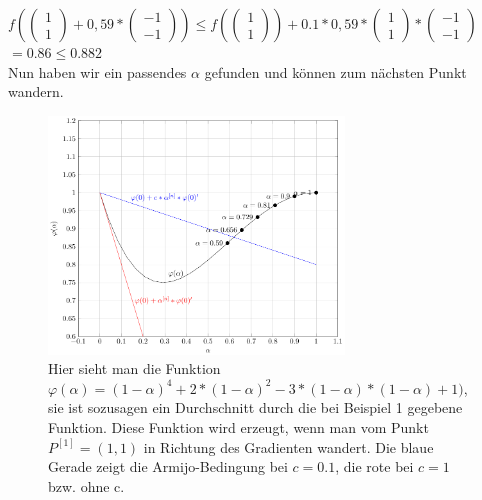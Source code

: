 \documentclass[naustrian]{article}
\begin{document}
{\begin{enumerate}
    $f( \left( \begin{array}{c} 1 \\ 1 \end{array} \right) + 0,59 * \left( \begin{array}{c} -1 \\ -1 \end{array} \right)) \leq f(\left( \begin{array}{c} 1 \\ 1 \end{array} \right)) + 0.1 * 0,59 *  \left( \begin{array}{c} 1 \\ 1 \end{array} \right) * \left( \begin{array}{c} -1 \\ -1 \end{array} \right)$ \\
    $= 0.86 \leq 0.882$ \\
    Nun haben wir ein passendes $\alpha$ gefunden und können zum nächsten Punkt wandern.

    \begin{figure}[H]
        \centering
        \includegraphics[width=0.7\textwidth]{grad/figure3}
        \caption[Die Armijo-Bedingung] {Hier sieht man die Funktion $\varphi(\alpha)=(1-\alpha)^4+2*(1-\alpha)^2-3*(1-\alpha)*(1-\alpha)+1)$, sie ist sozusagen ein Durchschnitt durch die bei Beispiel 1 gegebene Funktion. Diese Funktion wird erzeugt, wenn man vom Punkt $P^{[1]}=(1,1)$ in Richtung des Gradienten wandert. Die blaue Gerade zeigt die Armijo-Bedingung bei $c=0.1$, die rote bei $c=1$ bzw. ohne c.}
    \end{figure}


\end{enumerate}}
\end{document}
